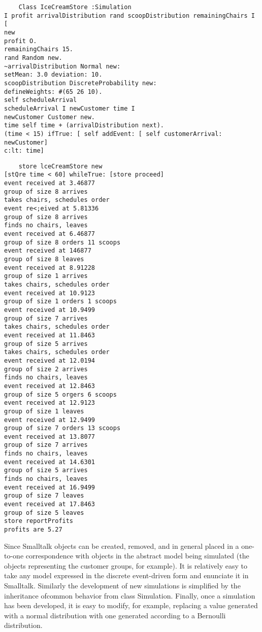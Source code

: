 \begin{lstlisting}
    Class IceCreamStore :Simulation
I profit arrivalDistribution rand scoopDistribution remainingChairs I
[
new
profit O.
remainingChairs 15.
rand Random new.
~arrivalDistribution Normal new:
setMean: 3.0 deviation: 10.
scoopDistribution DiscreteProbability new:
defineWeights: #(65 26 10).
self scheduleArrival
scheduleArrival I newCustomer time I
newCustomer Customer new.
time self time + (arrivalDistribution next).
(time < 15) ifTrue: [ self addEvent: [ self customerArrival: newCustomer]
c:lt: time]
\end{lstlisting}

\begin{lstlisting}
    store lceCreamStore new
[stQre time < 60] whileTrue: [store proceed]
event received at 3.46877
group of size 8 arrives
takes chairs, schedules order
event re<;eived at 5.81336
group of size 8 arrives
finds no chairs, leaves
event received at 6.46877
group of size 8 orders 11 scoops
event received at 146877
group of size 8 leaves
event received at 8.91228
group of size 1 arrives
takes chairs, schedules order
event received at 10.9123
group of size 1 orders 1 scoops
event received at 10.9499
group of size 7 arrives
takes chairs, schedules order
event received at 11.8463
group of size 5 arrives
takes chairs, schedules order
event received at 12.0194
group of size 2 arrives
finds no chairs, leaves
event received at 12.8463
group of size 5 orgers 6 scoops
event received at 12.9123
group of size 1 leaves
event received at 12.9499
group of size 7 orders 13 scoops
event received at 13.8077
group of size 7 arrives
finds no chairs, leaves
event received at 14.6301
group of size 5 arrives
finds no chairs, leaves
event received at 16.9499
group of size 7 leaves
event received at 17.8463
group of size 5 leaves
store reportProfits
profits are 5.27
\end{lstlisting}

Since Smalltalk objects can be created, removed, and in general placed in a
one-to-one correspondence with objects in the abstract model being simulated
(the objects representing the customer groups, for example). It is relatively
easy to take any model expressed in the discrete event-driven form and enunciate
it in Smalltalk. Similarly the development of new simulations is simplified by
the inheritance ofcommon behavior from class Simulation. Finally, once a
simulation has been developed, it is easy to modify, for example, replacing a
value generated with a normal distribution with one generated according to a
Bernoulli distribution.
